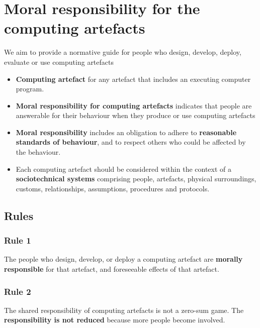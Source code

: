 \documentclass{article}
\begin{document}
\section{Moral responsibility for the computing artefacts}
\begin{flushleft}
We aim to provide a normative guide for people who design, develop, deploy, evaluate or use computing artefacts
\end{flushleft}
\begin{itemize}
  \item \textbf{Computing artefact} for any artefact that includes an executing computer program. 
  \item \textbf{Moral responsibility for computing artefacts} indicates that people are answerable for their behaviour when they produce or use computing artefacts 
  \item \textbf{Moral responsibility} includes an obligation to adhere to \textbf{reasonable standards of behaviour}, and to respect others who could be affected by the behaviour. 
  \item Each computing artefact should be considered within the context of a \textbf{sociotechnical systems} comprising people, artefacts, physical surroundings, customs, relationships, assumptions, procedures and protocols.
\end{itemize}

\subsection{Rules}

\subsubsection{Rule 1}
\begin{flushleft}
The people who design, develop, or deploy a computing artefact are \textbf{morally responsible} for that artefact, and foreseeable effects of that artefact.
\end{flushleft}

\subsubsection{Rule 2}
\begin{flushleft}
The shared responsibility of computing artefacts is not a zero-sum game. The \textbf{responsibility is not reduced} because more people become involved.
\end{flushleft}
\end{document}
